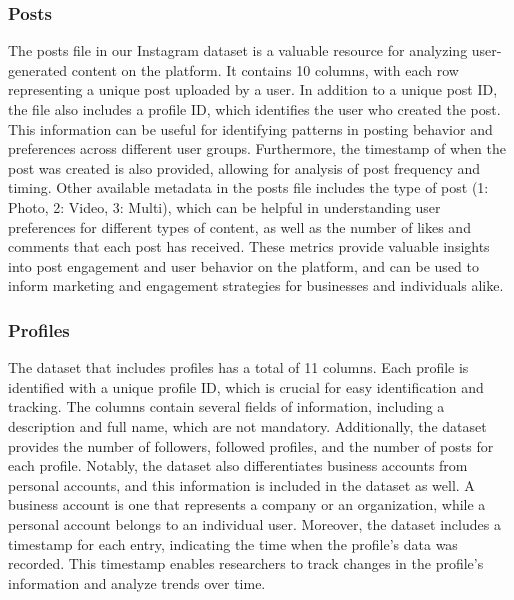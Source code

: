 \documentclass[conference]{IEEEtran}
\begin{document}
\subsubsection{Posts}
The posts file in our Instagram dataset is a valuable resource for analyzing user-generated content on the platform. It contains 10 columns, with each row representing a unique post uploaded by a user. 
In addition to a unique post ID, the file also includes a profile ID, which identifies the user who created the post. This information can be useful for identifying patterns in posting behavior and preferences across different user groups. Furthermore, the timestamp of when the post was created is also provided, allowing for analysis of post frequency and timing.
Other available metadata in the posts file includes the type of post (1: Photo, 2: Video, 3: Multi), which can be helpful in understanding user preferences for different types of content, as well as the number of likes and comments that each post has received. These metrics provide valuable insights into post engagement and user behavior on the platform, and can be used to inform marketing and engagement strategies for businesses and individuals alike.
\\
\subsubsection{Profiles}
The dataset that includes profiles has a total of 11 columns. Each profile is identified with a unique profile ID, which is crucial for easy identification and tracking. The columns contain several fields of information, including a description and full name, which are not mandatory. Additionally, the dataset provides the number of followers, followed profiles, and the number of posts for each profile. Notably, the dataset also differentiates business accounts from personal accounts, and this information is included in the dataset as well. A business account is one that represents a company or an organization, while a personal account belongs to an individual user. Moreover, the dataset includes a timestamp for each entry, indicating the time when the profile's data was recorded. This timestamp enables researchers to track changes in the profile's information and analyze trends over time.
\end{document}
